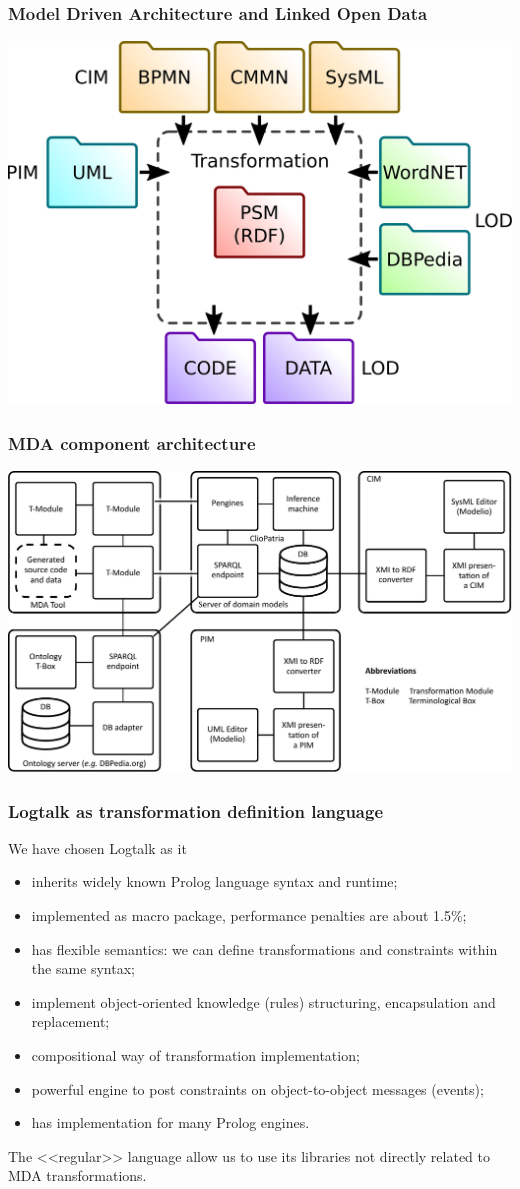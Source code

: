 \documentclass[10pt]{beamer}
\begin{document}
\begin{frame}
  \frametitle{Model Driven Architecture and Linked Open Data}
  \begin{center}
    \includegraphics[width=0.9\linewidth]{mda-overview.pdf}
  \end{center}
\end{frame}
\begin{frame}
  \frametitle{MDA component architecture}
  \centering
  \includegraphics[width=1\linewidth]{architecture-mda-lod-ext.pdf}
\end{frame}
\begin{frame}
  \frametitle{Logtalk as transformation definition language}
  We have chosen Logtalk as it
  \begin{itemize}
  \item inherits widely known Prolog language syntax and runtime;
  \item implemented as macro package, performance penalties are about 1.5\%;
  \item has flexible semantics: we can define transformations and constraints within the same syntax;
  \item implement object-oriented knowledge (rules) structuring, encapsulation and replacement;
  \item compositional way of transformation implementation;
  \item powerful engine to post constraints on object-to-object messages (events);
  \item has implementation for many Prolog engines.
  \end{itemize}
  The <<regular>> language allow us to use its libraries not directly related to MDA transformations.
\end{frame}
\end{document}
